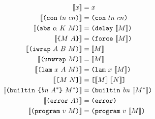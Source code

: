 \documentclass[../zerepoch-core-specification.tex]{subfiles}
\begin{document}
\begin{minipage}{\linewidth}
    \centering
    \begin{align*}%
       \erase{x}                      &= x                            \\
       \erase{\con{tn}{cn}}           &= \con{tn}{cn}                 \\
       \erase{\abs{\alpha}{K}{M}}     &= \delay{\erase{M}}            \\
       \erase{\inst{M}{A}}            &= \force{\erase{M}}            \\
       \erase{\iwrap{A}{B}{M}}        &= \erase{M}                    \\
       \erase{\unwrap{M}}             &= \erase{M}                    \\
       \erase{\lam{x}{A}{M}}          &= \lamU{x}{\erase{M}}          \\
       \erase{\app{M}{N}}             &= \appU{\erase{M}}{\erase{N}}  \\
       \erase{\builtin{bn}{A^*}{M^*}} &= \builtinU{bn}{\erase{M^*}}    \\
       \erase{\error{A}}              &= \errorU{}                     \\
       \erase{\version{v}{M}}        &= \version{v}{\erase{M}}
    \end{align*}
    \label{fig:type-erasure}
\end{minipage}
\end{document}
